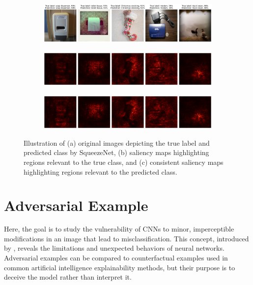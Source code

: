 \begin{figure}[H]
    \centering
    \begin{subfigure}{0.95\textwidth}
        \includegraphics[width=\textwidth]{bad_images_vgg16}
        \caption{}
        \label{subfig:bad_images_vgg16}
    \end{subfigure}
    \begin{subfigure}{0.95\textwidth}
        \includegraphics[width=\textwidth]{bad_true_class_saliency_vgg16}
        \caption{}
        \label{subfig:bad_true_class_saliency_vgg16}
    \end{subfigure}
    \begin{subfigure}{0.95\textwidth}
        \includegraphics[width=\textwidth]{bad_predicted_class_saliency_vgg16}
        \caption{}
        \label{subfig:bad_predicted_class_saliency_vgg16}
    \end{subfigure}
    \caption{Illustration of (a) original images depicting the true label and predicted class by SqueezeNet, (b) saliency maps highlighting regions relevant to the true class, and (c) consistent saliency maps highlighting regions relevant to the predicted class.}
    \label{fig:bad_saliency_map_vgg16}
\end{figure}


\section{Adversarial Example}

Here, the goal is to study the vulnerability of CNNs to minor, imperceptible modifications in an image that lead to misclassification. This concept, introduced by \cite{szegedy2014intriguing}, reveals the limitations and unexpected behaviors of neural networks. Adversarial examples can be compared to counterfactual examples used in common artificial intelligence explainability methods, but their purpose is to deceive the model rather than interpret it.

